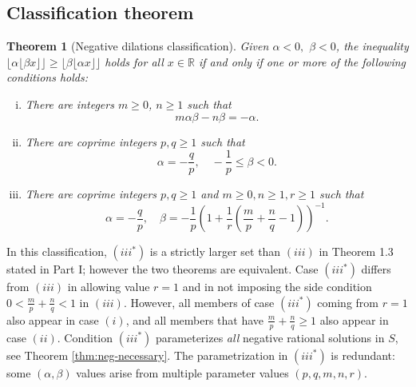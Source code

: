 \documentclass[11pt, letterpaper, reqno]{amsart}
\newtheorem{thm}{Theorem}[section]
\theoremstyle{definition}
\theoremstyle{remark}
\numberwithin{equation}{section}
\newcommand{\RR}{\ensuremath{\mathbb{R}}}
\newcommand{\floor}[1]{\lfloor{#1}\rfloor}
\begin{document}
\subsection{Classification theorem}

%
%
\begin{thm}[Negative dilations classification]\label{thm:negative}
Given %
$\alpha<0,$  $ \beta < 0$, the inequality
$
 \floor{\alpha \floor{\beta x}} \geq \floor{\beta \floor{\alpha x}}
$
holds for all $x \in \RR$ if and only if one or more of the following conditions holds:


\begin{enumerate}[(i)]
\item[(i)]\label{it:quad3-a} 
There are integers $m \geq 0$, $n\geq 1$ such that
\begin{equation}\label{quad3-1}
 m \alpha \beta - n \beta  = -\alpha.
\end{equation}

\item[(ii)]
\label{it:quad3-b} 
There are coprime integers $p,q\geq 1$ such that
\begin{equation}\label{quad3-2}
\alpha =- \frac{q}{p}, \quad  - \frac{1}{p} \leq \beta < 0 .
\end{equation}

\item[$(iii^{\ast})$]
 \label{it:quad3-c} There are coprime integers $p, q \geq 1$  and 
  $m\geq 0, n\geq 1, r \geq 1$ such that
\begin{equation}\label{quad3-3}
\alpha = -\frac{q}{p}, \quad \beta = -\frac{1}{p}\left(1 + \frac{1}{r}\left( \frac{m}{p} + \frac{n}{q}-1\right) \right)^{-1}.
\end{equation}
\end{enumerate}
\end{thm}



In this classification,
$(iii^{\ast})$  is a strictly larger set than   $(iii)$   in Theorem 1.3 stated in  Part I;  
however the two theorems are equivalent. 
Case $(iii^{\ast})$ differs from $(iii)$ in  allowing value  $r=1$ and in not  imposing the side condition 
$0<\frac{m}{p} + \frac{n}{q} <1$  in $(iii)$.  
However, all  members of case $(iii^{\ast})$ coming from $r=1$  also  appear in case $(i)$,
and all  members 
 that have  $ \frac{m}{p} + \frac{n}{q} \ge 1$ also  appear in  case $(ii)$.
Condition $(iii^*)$ parameterizes  
{\em all} negative rational solutions in $S$, 
see Theorem \ref{thm:neg-necessary}.
The parametrization in  $(iii^{\ast})$ is  redundant:
some $(\alpha, \beta)$ values arise from
multiple  parameter values  $(p,q,m,n,r)$.
\end{document}
